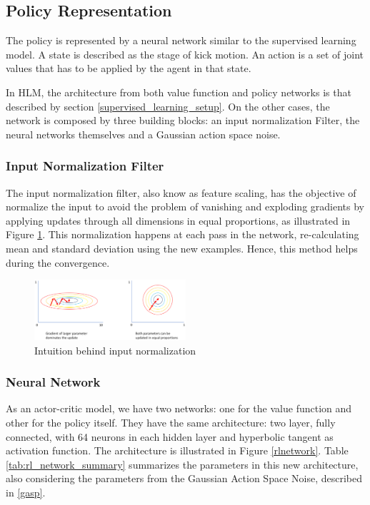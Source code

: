 \subsection{Policy Representation}

The policy is represented by a neural network similar to the supervised learning model. A state is described as the stage of kick motion. An action is a set of joint values that has to be applied by the agent in that state.

In HLM, the architecture from both value function and policy networks is that described by section \ref{supervised_learning_setup}. On the other cases, the network is composed by three building blocks: an input normalization Filter, the neural networks themselves and a Gaussian action space noise.

\subsubsection{Input Normalization Filter}\label{sec:inputnorm}
The input normalization filter, also know as feature scaling, has the objective of normalize the input to avoid the problem of vanishing and exploding gradients by applying updates through all dimensions in equal proportions, as illustrated in Figure \ref{inputnormfig}. This normalization happens at each pass in the network, re-calculating mean and standard deviation using the new examples. Hence, this method helps during the convergence.

\begin{figure}[!htbp]
	\centering
	\includegraphics[width=0.5\textwidth]{Cap5/inputnorm.eps}
	\caption{Intuition behind input normalization}
	\label{inputnormfig}
\end{figure}

\subsubsection{Neural Network}
As an actor-critic model, we have two networks: one for the value function and other for the policy itself. They have the same architecture: two layer, fully connected, with 64 neurons in each hidden layer and hyperbolic tangent as activation function. The architecture is illustrated in Figure \ref{rlnetwork}. Table \ref{tab:rl_network_summary} summarizes the parameters in this new architecture, also considering the parameters from the Gaussian Action Space Noise, described in \ref{gasp}.

